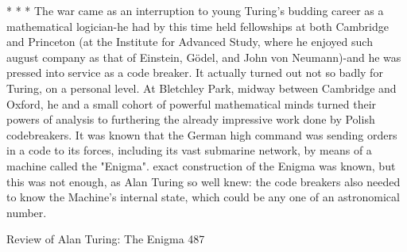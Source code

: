                                          * * *
       The war came as an interruption to young Turing's budding career as a
mathematical logician-he had by this time held fellowships at both Cambridge and
Princeton (at the Institute for Advanced Study, where he enjoyed such august
company as that of Einstein, Gödel, and John von Neumann)-and he was pressed into
service as a code breaker. It actually turned out not so badly for Turing, on a personal
level. At Bletchley Park, midway between Cambridge and Oxford, he and a small
cohort of powerful mathematical minds turned their powers of analysis to furthering
the already impressive work done by Polish codebreakers. It was known that the
German high command was sending orders in a code to its forces, including its vast
submarine network, by means of a machine called the "Enigma". exact construction of
the Enigma was known, but this was not enough, as Alan Turing so well knew: the
code breakers also needed to know the Machine's internal state, which could be any
one of an astronomical number.




Review of Alan Turing: The Enigma                                                   487

